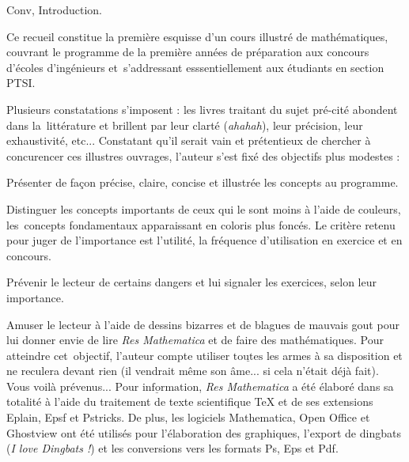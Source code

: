                                                     \ifHtml   \fi
                          

\iffalse\Chapter Conv, Introduction.

Ce recueil constitue la première esquisse d'un cours illustré de mathématiques, 
couvrant le programme de la première années de préparation aux concours d'écoles d'ingénieurs 
et~s'addressant esssentiellement aux étudiants en section PTSI. 
\bigskip

Plusieurs constatations s'imposent : les livres traitant du sujet pré-cité abondent dans la~littérature 
et brillent par leur clarté ({\it ahahah}), leur précision, leur exhaustivité, etc...
Constatant qu'il serait vain et prétentieux de chercher à concurencer ces illustres ouvrages, 
l'auteur s'est fixé des objectifs plus modestes : 
\medskip

\Bullet Présenter de fa\c con précise, claire, concise et illustrée les concepts au programme. 
\medskip

\Bullet Distinguer les concepts importants de ceux qui le sont moins à l'aide de couleurs, 
les~concepts fondamentaux apparaissant en coloris plus foncés. 
Le critère retenu pour juger de l'importance est l'utilité, la fréquence d'utilisation en exercice et en concours. 
\bigskip
{}
\bigskip

\Bullet Prévenir le lecteur de certains dangers et lui signaler les exercices, selon leur importance. 

\bigskip
{}
\bigskip

\Bullet Amuser le lecteur à l'aide de dessins bizarres et de blagues de mauvais gout pour lui donner envie de lire {\it Res Mathematica} 
et de faire des mathématiques. Pour atteindre cet~objectif, l'auteur compte utiliser $\underline{\mbox{toutes}}$ les armes à sa disposition et ne reculera devant rien (il vendrait même son âme... si cela n'était déjà fait). 
Vous voilà prévenus... 
\bigskip
\vfill
\noindent $\underline{\mbox{Pour information}}$, {\it Res Mathematica} a été élaboré dans sa totalité à l'aide du traitement de texte scientifique \TeX{} et de ses 
extensions Eplain, Epsf et Pstricks. De plus, les logiciels Mathematica, Open Office et Ghostview ont été utilisés pour
l'élaboration des graphiques, l'export de dingbats ({\it I love Dingbats !}) et les conversions vers les formats Ps, Eps et Pdf. 

